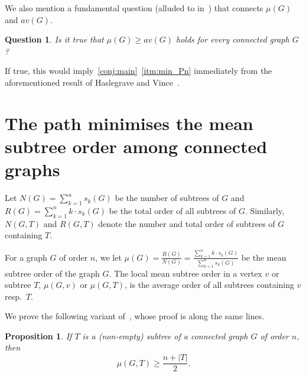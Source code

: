 \documentclass[11pt]{article}
\newtheorem{q}[thr]{Question}
\newtheorem{prop}[thr]{Proposition}
\theoremstyle{definition}
\newcommand*{\abs}[1]{\lvert #1\rvert}
\newcommand*{\av}{av}
\begin{document}
We also mention a fundamental question (alluded to in~\cite{John22b,John22}) that connects $\mu(G)$ and $\av(G)$.

\begin{q}\label{mu_vs_av}
    Is it true that $\mu(G) \ge \av(G)$ holds for every connected graph $G$?
\end{q}

If true, this would imply~\cref{conj:main}~\ref{itm:min_Pn} immediately from the aforementioned result of Haslegrave and Vince~\cite{John22, Vince22}.

\section{The path minimises the mean subtree order among connected graphs}\label{sec:proofPnMinimiser}

Let $N(G)=\sum_{k=1}^n s_k(G)$ be the number of subtrees of $G$ and $R(G)= \sum_{k=1}^n k\cdot s_k(G) $ be the total order of all subtrees of $G$.
Similarly, $N(G,T)$ and $R(G,T)$ denote the number and total order of subtrees of $G$ containing $T.$

For a graph $G$ of order $n$, we let $\mu(G) = \frac{R(G)}{N(G)} = \frac{ \sum_{k=1}^n k\cdot s_k(G)}{ \sum_{k=1}^n s_k(G)}$ be the mean subtree order of the graph $G$. 
The local mean subtree order in a vertex $v$ or subtree $T$, $\mu(G, v)$ or $\mu(G, T)$, is the average order of all subtrees containing $v$ resp.~$T$.

We prove the following variant of~\cite[Thm.~3.1]{Vince22}, whose proof is along the same lines.
 
\begin{prop}\label{prop:localsubtreeorder} If $T$ is a (non-empty) subtree of a connected graph $G$ of order $n$, then
\[\mu(G,T) \ge \frac{n+\abs{T}}{2}.\]
\end{prop}
\end{document}
